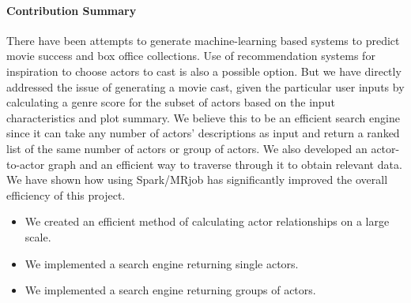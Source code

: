 \paragraph{Contribution Summary}
There have been attempts to generate machine-learning based systems to predict movie success and box office collections. Use of recommendation systems for inspiration to choose actors to cast is also a possible option. But we have directly addressed the issue of generating a movie cast, given the particular user inputs by calculating a genre score for the subset of actors based on the input characteristics and plot summary. We believe this to be an efficient search engine since it can take any number of actors’ descriptions as input and return a ranked list of the same number of actors or group of actors. We also developed an actor-to-actor graph and an efficient way to traverse through it to obtain relevant data. We have shown how using Spark/MRjob has significantly improved the overall efficiency of this project. 

\begin{itemize}
    \item We created an efficient method of calculating actor relationships on a large scale.
    \item We implemented a search engine returning single actors.
    \item We implemented a search engine returning groups of actors.
\end{itemize}
